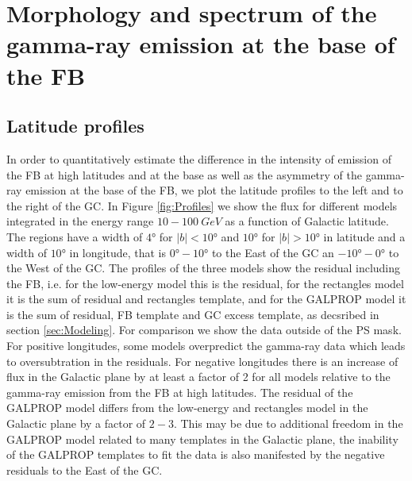 \section{Morphology and spectrum of the gamma-ray emission at the base of the FB}


\subsection{Latitude profiles}
\label{sec:Latitude_profiles}

In order to quantitatively estimate the difference in the intensity of emission of the FB at high latitudes and at the base as well as the asymmetry
of the gamma-ray emission at the base of the FB,
we plot the latitude profiles to the left and to the right of the GC.
In Figure \ref{fig:Profiles} we show the flux for different models integrated in the energy range $10 - \SI{100}{GeV}$ as a function of Galactic latitude. 
The regions have a width of $\ang{4}$ for $|b|<\ang{10}$ and $\ang{10}$ for $|b|>\ang{10}$ in latitude and a width of $\ang{10}$ in longitude, that is $\ang{0} - \ang{10}$ to the East of the GC an $\ang{-10} - \ang{0}$ to the West of the GC. The profiles of the three models show the residual including the FB, i.e. for the low-energy model this is the residual, for the rectangles model it is the sum of residual and rectangles template, and for the GALPROP model it is the sum of residual, FB template and GC excess template, as decsribed in section \ref{sec:Modeling}. For comparison we show the data outside of the PS mask.
For positive longitudes,
some models overpredict the gamma-ray data which leads to oversubtration in the residuals.
For negative longitudes there is an increase of flux in the Galactic plane by at least a factor of 2 for all models relative to the gamma-ray emission
from the FB at high latitudes. 
The residual of the GALPROP model differs from the low-energy and rectangles model in the Galactic plane by a factor of $2-3$. 
This may be due to additional freedom in the GALPROP model related to many templates in the Galactic plane,
the inability of the GALPROP templates to fit the data is also manifested by the negative residuals to the East of the GC.


